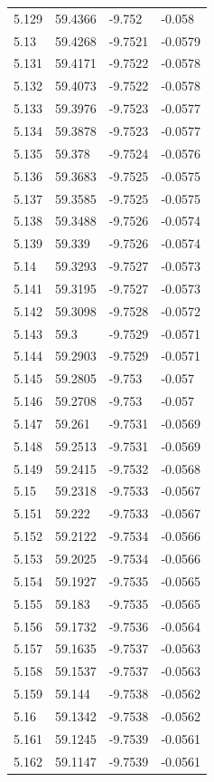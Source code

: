 \begin{tabular}{llll}
5.129 & 59.4366 & -9.752 & -0.058 \\
5.13 & 59.4268 & -9.7521 & -0.0579 \\
5.131 & 59.4171 & -9.7522 & -0.0578 \\
5.132 & 59.4073 & -9.7522 & -0.0578 \\
5.133 & 59.3976 & -9.7523 & -0.0577 \\
5.134 & 59.3878 & -9.7523 & -0.0577 \\
5.135 & 59.378 & -9.7524 & -0.0576 \\
5.136 & 59.3683 & -9.7525 & -0.0575 \\
5.137 & 59.3585 & -9.7525 & -0.0575 \\
5.138 & 59.3488 & -9.7526 & -0.0574 \\
5.139 & 59.339 & -9.7526 & -0.0574 \\
5.14 & 59.3293 & -9.7527 & -0.0573 \\
5.141 & 59.3195 & -9.7527 & -0.0573 \\
5.142 & 59.3098 & -9.7528 & -0.0572 \\
5.143 & 59.3 & -9.7529 & -0.0571 \\
5.144 & 59.2903 & -9.7529 & -0.0571 \\
5.145 & 59.2805 & -9.753 & -0.057 \\
5.146 & 59.2708 & -9.753 & -0.057 \\
5.147 & 59.261 & -9.7531 & -0.0569 \\
5.148 & 59.2513 & -9.7531 & -0.0569 \\
5.149 & 59.2415 & -9.7532 & -0.0568 \\
5.15 & 59.2318 & -9.7533 & -0.0567 \\
5.151 & 59.222 & -9.7533 & -0.0567 \\
5.152 & 59.2122 & -9.7534 & -0.0566 \\
5.153 & 59.2025 & -9.7534 & -0.0566 \\
5.154 & 59.1927 & -9.7535 & -0.0565 \\
5.155 & 59.183 & -9.7535 & -0.0565 \\
5.156 & 59.1732 & -9.7536 & -0.0564 \\
5.157 & 59.1635 & -9.7537 & -0.0563 \\
5.158 & 59.1537 & -9.7537 & -0.0563 \\
5.159 & 59.144 & -9.7538 & -0.0562 \\
5.16 & 59.1342 & -9.7538 & -0.0562 \\
5.161 & 59.1245 & -9.7539 & -0.0561 \\
5.162 & 59.1147 & -9.7539 & -0.0561 \\

\end{tabular}
